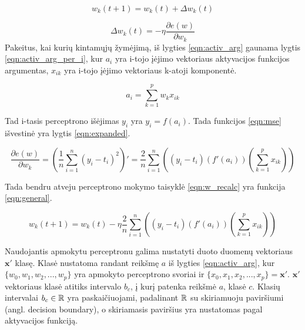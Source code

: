 \begin{equation}
	\label{eqn:w_recalc}
	w_k(t + 1) = w_k(t) + \Delta w_k(t)
\end{equation}

\begin{equation}
	\label{eqn:w_change}
	\Delta w_k(t) = - \eta \dfrac{\partial e(w)}{\partial w_k}
\end{equation}
Pakeitus, kai kurių kintamųjų žymėjimą, iš lygties \ref{eqn:activ_arg} gaunama lygtis \ref{eqn:activ_arg_per_i}, kur $a_i$ yra i-tojo įėjimo vektoriaus aktyvacijos funkcijos argumentas, $x_{ik}$ yra i-tojo įėjimo vektoriaus k-atoji komponentė.

\begin{equation}
	\label{eqn:activ_arg_per_i}
	a_i = \sum_{k = 1}^{p} w_{k}x_{ik}
\end{equation}

Tad i-tasis perceptrono išėjimas $y_i$ yra $y_i = f(a_i)$. Tada funkcijos \ref{eqn:mse} išvestinė yra lygtis \ref{eqn:expanded}.

\begin{equation}
	\label{eqn:expanded}
	\dfrac{\partial e(w)}{\partial w_k} = (\dfrac{1}{n}\sum_{i=1}^{n} (y_i - t_i)^2)'
		= \dfrac{2}{n}\sum_{i=1}^{n}
			((y_i - t_i)(f'(a_i))(\sum_{k = 1}^{p} x_{ik}))
\end{equation}

Tada bendru atveju perceptrono mokymo taisyklė \ref{eqn:w_recalc} yra funkcija \ref{eqn:general}.

\begin{equation}
	\label{eqn:general}
	w_k(t + 1) = w_k(t) - \eta \dfrac{2}{n}\sum_{i=1}^{n} ((y_i - t_i)(f'(a_i))(\sum_{k = 1}^{p} x_{ik}))
\end{equation}

Naudojantis apmokytu perceptronu galima nustatyti duoto duomenų vektoriaus $\boldsymbol{x}'$ klasę. Klasė nustatoma randant reikšmę $a$ iš lygties \ref{eqn:activ_arg}, kur $\{w_{0}, w_{1}, w_{2}, ..., w_{p}\}$ yra apmokyto perceptrono svoriai ir $\{x_{0}, x_{1}, x_{2}, ..., x_{p}\} = \boldsymbol{x}'$. $\boldsymbol{x}'$ vektoriaus klasė atitiks intervalo $b_c$, į kurį patenka reikšmė $a$, klasė $c$. Klasių intervalai $b_c \in \mathbb{R}$ yra paskaičiuojami, padalinant $\mathbb{R}$ su skiriamuoju paviršiumi (angl. decision boundary), o skiriamasis paviršius yra nustatomas pagal aktyvacijos funkciją.
